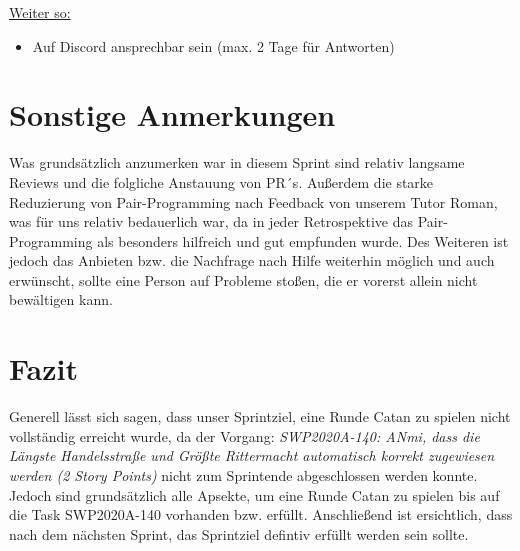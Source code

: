\documentclass[12pt,a4paper, oneside]{article}
\begin{document}
\underline{Weiter so:}
\begin{itemize}
    \item Auf Discord ansprechbar sein (max. 2 Tage für Antworten)
\end{itemize}

\newpage
\section{Sonstige Anmerkungen}
Was grundsätzlich anzumerken war in diesem Sprint sind relativ langsame Reviews und die folgliche Anstauung von PR´s.
Außerdem die starke Reduzierung von Pair-Programming nach Feedback von unserem Tutor Roman, was für uns relativ bedauerlich war, da in jeder Retrospektive das Pair-Programming als besonders hilfreich und gut empfunden wurde.
Des Weiteren ist jedoch das Anbieten bzw. die Nachfrage nach Hilfe weiterhin möglich und auch erwünscht, sollte eine Person auf Probleme stoßen, die er vorerst allein nicht bewältigen kann.

\section{Fazit}
Generell lässt sich sagen, dass unser Sprintziel, eine Runde Catan zu spielen nicht vollständig erreicht wurde, da der Vorgang: \textit{SWP2020A-140: ANmi, dass die Längste Handelsstraße und Größte Rittermacht automatisch korrekt zugewiesen werden (2 Story Points)} nicht zum Sprintende abgeschlossen werden konnte.
Jedoch sind grundsätzlich alle Apsekte, um eine Runde Catan zu spielen bis auf die Task SWP2020A-140 vorhanden bzw. erfüllt.
Anschließend ist ersichtlich, dass nach dem nächsten Sprint, das Sprintziel defintiv erfüllt werden sein sollte.
\end{document}
